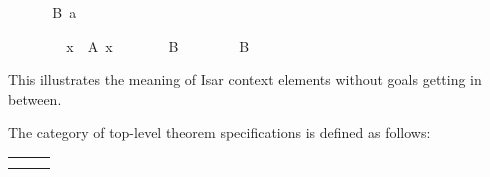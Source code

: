 \begin{isabellebody}
\begin{minipage}[t]{0.4\textwidth}
{\isafoldnoproof}%
%
\isadelimnoproof
\isanewline
%
\endisadelimnoproof
%
\isadelimproof
\ \ %
\endisadelimproof
%
\isatagproof
\isacommand{{\isacharbraceright}}\isamarkupfalse%
\isanewline
\ \ \isamarkupfalse%
\ {\isacharbackquoteopen}B\ a{\isacharbackquoteclose}%
\end{minipage}\quad\begin{minipage}[t]{0.4\textwidth}
\ \ \isacommand{{\isacharbraceleft}}\isamarkupfalse%
\isanewline
\ \ \ \ \isamarkupfalse%
\ x\ \ {\isachardoublequoteopen}A\ x{\isachardoublequoteclose}%
\endisatagproof
{\isafoldproof}%
%
\isadelimproof
%
\endisadelimproof
%
\isadelimnoproof
\ %
\endisadelimnoproof
%
\isatagnoproof
{}\isamarkupfalse%
%
\endisatagnoproof
{\isafoldnoproof}%
%
\isadelimnoproof
\isanewline
%
\endisadelimnoproof
%
\isadelimproof
\ \ \ \ %
\endisadelimproof
%
\isatagproof
{}\isamarkupfalse%
\ B%
\endisatagproof
{\isafoldproof}%
%
\isadelimproof
%
\endisadelimproof
%
\isadelimnoproof
\ %
\endisadelimnoproof
%
\isatagnoproof
{}\isamarkupfalse%
%
\endisatagnoproof
{\isafoldnoproof}%
%
\isadelimnoproof
\isanewline
%
\endisadelimnoproof
%
\isadelimproof
\ \ %
\endisadelimproof
%
\isatagproof
\isacommand{{\isacharbraceright}}\isamarkupfalse%
\isanewline
\ \ \isamarkupfalse%
\ {\isacharbackquoteopen}B{\isacharbackquoteclose}%
\end{minipage}
%
\endisatagproof
{\isafoldproof}%
%
\isadelimproof
%
\endisadelimproof
%
\begin{isamarkuptext}%
\bigskip\noindent This illustrates the meaning of Isar context
  elements without goals getting in between.%
\end{isamarkuptext}%
\isamarkuptrue%
%
\isamarkuptrue%
%
\begin{isamarkuptext}%
The category  of top-level theorem specifications
  is defined as follows:

  \medskip
  \begin{tabular}{rcl}
  \isa{{\isachardoublequote}statement{\isachardoublequote}} & \isa{{\isachardoublequote}{\isasymequiv}{\isachardoublequote}} & \isa{{\isachardoublequote}name{\isacharcolon}\ props\ {\isasymAND}\ {\isasymdots}{\isachardoublequote}} \\
  & \isa{{\isachardoublequote}{\isacharbar}{\isachardoublequote}} & \isa{{\isachardoublequote}context\isactrlsup {\isacharasterisk}\ conclusion{\isachardoublequote}} \\[0.5ex]


\end{tabular}
\end{isamarkuptext}
\end{isabellebody}
